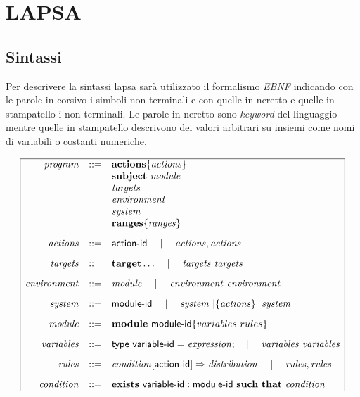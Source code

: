 \chapter{LAPSA}
\section{Sintassi}
Per descrivere la sintassi \ac{lapsa} sarà utilizzato il formalismo \emph{EBNF} indicando con le parole in corsivo i simboli non terminali e con quelle in neretto e quelle in stampatello i non terminali. Le parole in neretto sono \emph{keyword} del linguaggio mentre quelle in stampatello descrivono dei valori arbitrari su insiemi come nomi di variabili o costanti numeriche.

\begin{table} %
$$
\begin{array}{|rcl|}
\hline
\mathit{program} &::=& \mathbf{actions} \{ \mathit{actions} \} \\
	&& \mathbf{subject} \Space \mathit{module} \\
	&& \mathit{targets} \\
	&& \mathit{environment} \\
	&& \mathit{system} \\
	&& \mathbf{ranges} \{ \mathit{ranges} \}
	\\[.3cm]
\mathit{actions} &::=& \x{action}\textrm{-}\x{id} \Sep \mathit{actions} , \mathit{actions}
	\\[.3cm]
\mathit{targets} &::=& \mathbf{target} \dots \Sep \mathit{targets} \Space \mathit{targets}
	\\[.3cm]
\mathit{environment} &::=& \mathit{module} \Sep \mathit{environment} \Space \mathit{environment}
	\\[.3cm]
\mathit{system} &::=& \x{module}\textrm{-}\x{id} \Sep \mathit{system} \Par{\{\mathit{actions}\}} \mathit{system}
	\\[.3cm]
\mathit{module} &::=& \mathbf{module} \Space \x{module}\textrm{-}\x{id} \{ variables \Space rules \}
	\\[.3cm]
\mathit{variables} &::=& \x{type} \Space \x{variable}\textrm{-}\x{id} = \mathit{expression}; \Sep \mathit{variables} \Space \mathit{variables}
	\\[.3cm]
\mathit{rules} &::=& \mathit{condition} [ \x{action}\textrm{-}\x{id}]\Rightarrow \mathit{distribution} \Sep \mathit{rules},\mathit{rules}
	\\[.3cm]
\mathit{condition} &::=& \mathbf{exists} \Space \x{variable}\textrm{-}\x{id}:\x{module}\textrm{-}\x{id} \Space \mathbf{such}\Space\mathbf{that} \Space \mathit{condition} \\

\end{array}$$
\end{table}
